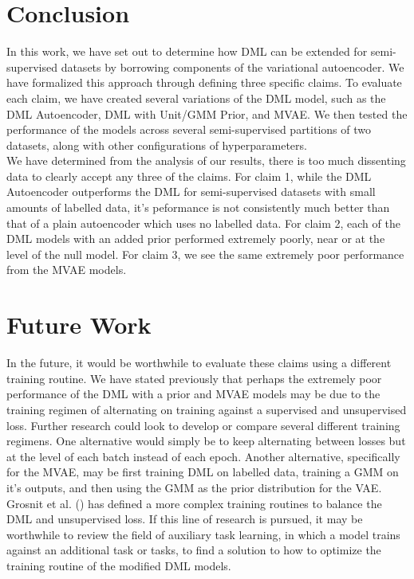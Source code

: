 \documentclass[./dissertation.tex]{subfiles}
\begin{document}
    \section{Conclusion}
    
    In this work, we have set out to determine how DML can be extended for semi-supervised datasets by borrowing components of the variational autoencoder. We have formalized this approach through defining three specific claims. To evaluate each claim, we have created several variations of the DML model, such as the DML Autoencoder, DML with Unit/GMM Prior, and MVAE. We then tested the performance of the models across several semi-supervised partitions of two datasets, along with other configurations of hyperparameters.  \\
    
    We have determined from the analysis of our results, there is too much dissenting data to clearly accept any three of the claims. For claim 1, while the DML Autoencoder outperforms the DML for semi-supervised datasets with small amounts of labelled data, it's peformance is not consistently much better than that of a plain autoencoder which uses no labelled data. For claim 2, each of the DML models with an added prior performed extremely poorly, near or at the level of the null model. For claim 3, we see the same extremely poor performance from the MVAE models. 
    
    \section{Future Work}
    
    In the future, it would be worthwhile to evaluate these claims using a different training routine. We have stated previously that perhaps the extremely poor performance of the DML with a prior and MVAE models may be due to the training regimen of alternating on training against a supervised and unsupervised loss. Further research could look to develop or compare several different training regimens. One alternative would simply be to keep alternating between losses but at the level of each batch instead of each epoch. Another alternative, specifically for the MVAE, may be first training DML on labelled data, training a GMM on it's outputs, and then using the GMM as the prior distribution for the VAE.
    Grosnit et al. (\citeyear{grosnit2021high}) has defined a more complex training routines to balance the DML and unsupervised loss. If this line of research is pursued, it may be worthwhile to review the field of auxiliary task learning, in which a model trains against an additional task or tasks, to find a solution to how to optimize the training routine of the modified DML models. \\
    
\end{document}
